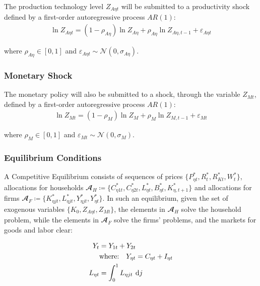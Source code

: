 \documentclass[../thesis.tex]{subfiles}
\begin{document}
The production technology level $Z_{A\eta t}$ will be submitted to a productivity shock defined by a first-order autoregressive process $AR(1)$:
\begin{align}
	\ln{Z_{A\eta t}} = (1-\rho_{A\eta})\ln{Z_{A\eta}} + \rho_{A\eta}\ln{Z_{A\eta,t-1}} + \varepsilon_{A\eta t} \label{eq:reg-productivity-shock}
\end{align}

where $\rho_{A\eta} \in [0,1]$ and $\varepsilon_{A\eta t} \sim \mathscr{N}(0,\sigma_{A\eta})$.

\subsubsection*{Monetary Shock} \label{sec:reg-monetary-shock}

The monetary policy will also be submitted to a shock, through the variable $Z_{Mt}$, defined by a first-order autoregressive process $AR(1)$:
\begin{align}
	\ln{Z_{Mt}} = (1-\rho_M)\ln{Z_{M}} + \rho_M\ln{Z_{M,t-1}} + \varepsilon_{Mt} \label{eq:reg-monetary-shock}
\end{align}

where $\rho_M \in [0,1]$ and $\varepsilon_{Mt} \sim \mathscr{N}(0,\sigma_M)$.


\subsubsection{Equilibrium Conditions}


A Competitive Equilibrium consists of sequences of prices $\{P_{\eta t}^{\ast}, R_t^{\ast}, R_{Kt}^{\ast}, W_t^{\ast}\}$, allocations for households $\mathbfscr{A}_H \coloneq \{C_{\eta 1 t}^{\ast}, C_{\eta 2 t}^{\ast}, L_{\eta t}^{\ast}, B_{\eta t}^{\ast}, K_{\eta, t+1}^{\ast}\}$ and allocations  for firms $\mathbfscr{A}_F \coloneq \{K_{\eta jt}^{\ast}, L_{\eta jt}^{\ast}, Y_{\eta jt}^{\ast}, Y_{\eta t}^{\ast}\}$. In such an equilibrium, given the set of exogenous variables $\{K_0, Z_{A\eta t}, Z_{Mt}\}$, the elements in $\mathbfscr{A}_H$ solve the household problem, while the elements in $\mathbfscr{A}_F$ solve the firms' problems, and the markets for goods and labor clear:
\begin{tcolorbox}[colback=red!5!white,colframe=red!75!black]
	
	\begin{align}
		Y_{t} &= Y_{1 t} + Y_{2 t} \label{eq:reg-market-clearing-condition-Yt} \\
		& \text{where:} \quad Y_{\eta t} = C_{\eta t} + I_{\eta t} \label{eq:reg-regional-demand} \\
		L_{\eta t} &= \int_{0}^{1} L_{\eta jt} \: \operatorname{d} \! j \label{eq:reg-market-clearing-condition-Lt}
	\end{align}
	
\end{tcolorbox}
\end{document}
